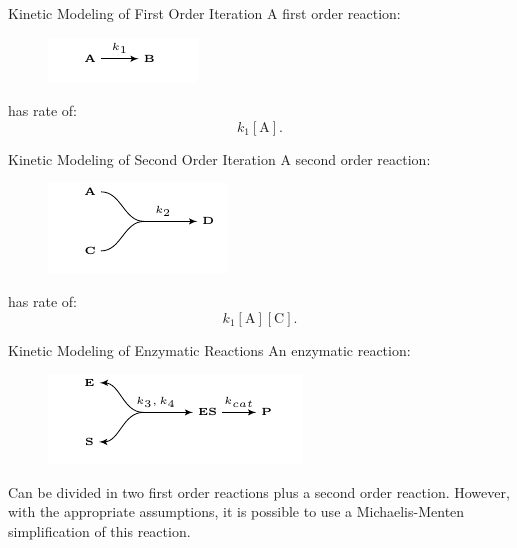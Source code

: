 \documentclass{beamer}
\begin{document}
\begin{frame}{Kinetic Modeling of First Order Iteration}
A first order reaction:
\begin{figure}
\includegraphics[scale=1.5]{fundamental_concepts/first_order_reaction.pdf}
\end{figure}
\pause
has rate of:
\begin{equation*}
k_1[\text{A}].
\end{equation*}
\end{frame}

\begin{frame}{Kinetic Modeling of Second Order Iteration}
A second order reaction:
\begin{figure}
\includegraphics[scale=1.5]{fundamental_concepts/second_order_reaction.pdf}
\end{figure}
\pause
has rate of:
\begin{equation*}
    k_1[\text{A}][\text{C}].
\end{equation*}
\end{frame}


\begin{frame}{Kinetic Modeling of Enzymatic Reactions}
An enzymatic reaction:
\begin{figure}
\includegraphics[scale=1.5]{fundamental_concepts/enzymatic_reaction.pdf}
\end{figure}
\pause
Can be divided in two first order reactions plus a second order 
reaction.
\pause
However, with the appropriate assumptions, it is possible to use a 
Michaelis-Menten simplification of this reaction.
\end{frame}
\end{document}
